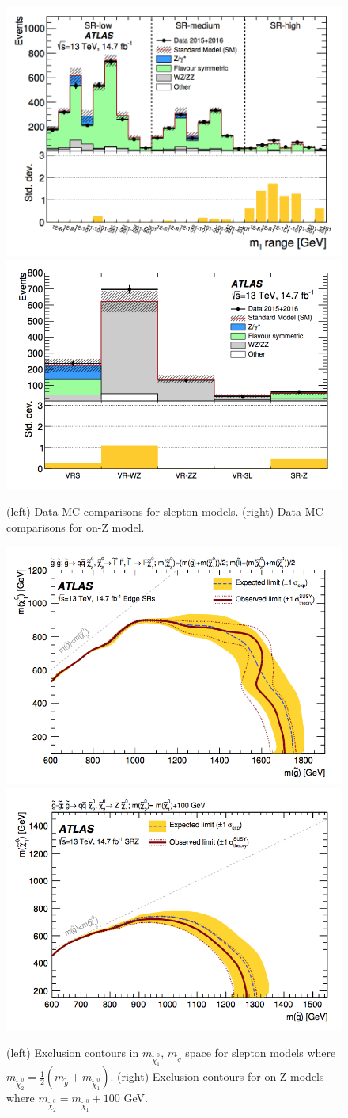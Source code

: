 \documentclass{article}
\begin{document}
\begin{figure}[t]
    \centering
    \includegraphics[width=0.4\linewidth]{images/slepton_results.png}
    \includegraphics[width=0.45\linewidth]{images/on-Z_results.png}
    \caption{(left) Data-MC comparisons for slepton models. (right) Data-MC comparisons for on-Z model.}
    \label{results}
\end{figure}

\begin{figure}[t]
    \centering
    \includegraphics[width=0.45\linewidth]{images/slepton_exclusion.png}
    \includegraphics[width=0.45\linewidth]{images/on-Z_exclusion.png}
    \caption{(left) Exclusion contours in $m_{\tilde{\chi}_1^0}$, $m_{\tilde{g}}$ space for slepton models where $m_{\tilde{\chi}_2^0} = \frac{1}{2}(m_{\tilde{g}} + m_{\tilde{\chi}_1^0})$. (right) Exclusion contours for on-Z models where $m_{\tilde{\chi}_2^0} = m_{\tilde{\chi}_1^0} + 100$ GeV.}
    \label{exclusion}
\end{figure}
\end{document}
